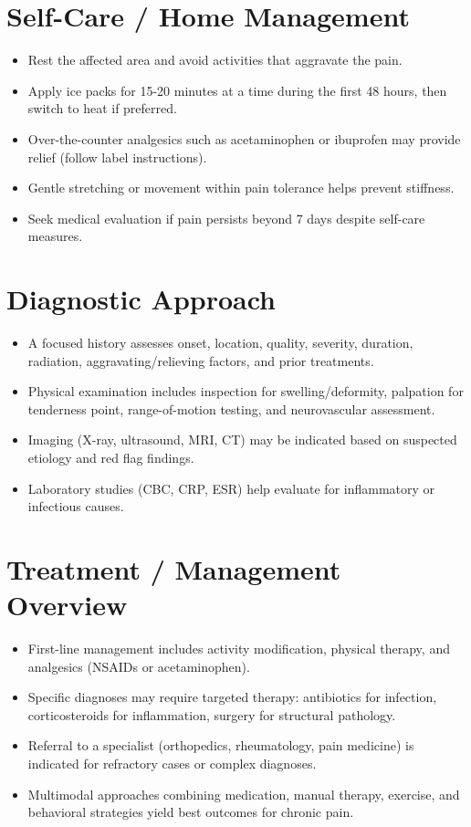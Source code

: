 \section*{Self-Care / Home Management}
\begin{itemize}
  \item Rest the affected area and avoid activities that aggravate the pain.
  \item Apply ice packs for 15-20 minutes at a time during the first 48 hours, then switch to heat if preferred.
  \item Over-the-counter analgesics such as acetaminophen or ibuprofen may provide relief (follow label instructions).
  \item Gentle stretching or movement within pain tolerance helps prevent stiffness.
  \item Seek medical evaluation if pain persists beyond 7 days despite self-care measures.
\end{itemize}

\section*{Diagnostic Approach}
\begin{itemize}
  \item A focused history assesses onset, location, quality, severity, duration, radiation, aggravating/relieving factors, and prior treatments.
  \item Physical examination includes inspection for swelling/deformity, palpation for tenderness point, range-of-motion testing, and neurovascular assessment.
  \item Imaging (X-ray, ultrasound, MRI, CT) may be indicated based on suspected etiology and red flag findings.
  \item Laboratory studies (CBC, CRP, ESR) help evaluate for inflammatory or infectious causes.
\end{itemize}

\section*{Treatment / Management Overview}
\begin{itemize}
  \item First-line management includes activity modification, physical therapy, and analgesics (NSAIDs or acetaminophen).
  \item Specific diagnoses may require targeted therapy: antibiotics for infection, corticosteroids for inflammation, surgery for structural pathology.
  \item Referral to a specialist (orthopedics, rheumatology, pain medicine) is indicated for refractory cases or complex diagnoses.
  \item Multimodal approaches combining medication, manual therapy, exercise, and behavioral strategies yield best outcomes for chronic pain.
\end{itemize}

\clearpage
